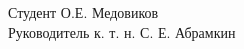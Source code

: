 \vspace{3cm}

\begin{flushleft}
 \hspace{1cm} Студент \hspace{7cm} \underline{\hspace{3cm}}  О.Е. Медовиков \\ 
 \vspace{5mm}
 \hspace{1cm} Руководитель \hspace{2cm} к. т. н. \hspace{2cm} \underline{\hspace{3cm}}  С. Е. Абрамкин\\ 
\end{flushleft}

\thispagestyle{empty} %

